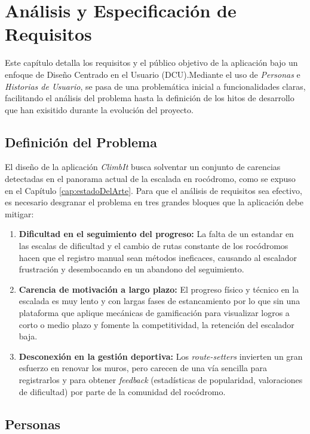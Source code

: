 \chapter{Análisis y Especificación de Requisitos}
\label{cap:analisisRequisitos}

Este capítulo detalla los requisitos y el público objetivo de la aplicación bajo un enfoque de Diseño Centrado en el Usuario (DCU).Mediante el uso de \textit{Personas} e \textit{Historias de Usuario}, se pasa de una problemática inicial a funcionalidades claras, facilitando el análisis del problema hasta la definición de los hitos de desarrollo que han exisitido durante la evolución del proyecto.

\section{Definición del Problema}

El diseño de la aplicación \textit{ClimbIt} busca solventar un conjunto de carencias detectadas en el panorama actual de la escalada en rocódromo, como se expuso en el Capítulo \ref{cap:estadoDelArte}. Para que el análisis de requisitos sea efectivo, es necesario desgranar el problema en tres grandes bloques que la aplicación debe mitigar:

\begin{enumerate}
    \item \textbf{Dificultad en el seguimiento del progreso:} La falta de un estandar en las escalas de dificultad y el cambio de rutas constante de los rocódromos hacen que el registro manual sean métodos ineficaces, causando al escalador frustración y desembocando en un abandono del seguimiento.
    \item \textbf{Carencia de motivación a largo plazo:} El progreso físico y técnico en la escalada es muy lento y con largas fases de estancamiento por lo que sin una plataforma que aplique mecánicas de gamificación para visualizar logros a corto o medio plazo y fomente la competitividad, la retención del escalador baja.
    \item \textbf{Desconexión en la gestión deportiva:} Los \textit{route-setters} invierten un gran esfuerzo en renovar los muros, pero carecen de una vía sencilla para registrarlos y para obtener \textit{feedback} (estadísticas de popularidad, valoraciones de dificultad) por parte de la comunidad del rocódromo.
\end{enumerate}

\section{Personas}

